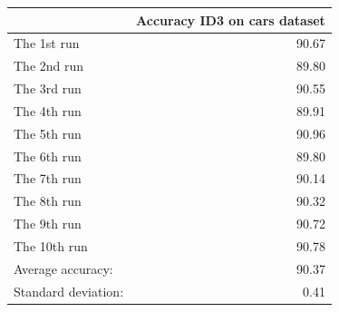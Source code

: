 \begin{tabular}{lr}
\toprule
{} &  Accuracy ID3 on cars dataset \\
\midrule
The 1st run         &                         90.67 \\
The 2nd run         &                         89.80 \\
The 3rd run         &                         90.55 \\
The 4th run         &                         89.91 \\
The 5th run         &                         90.96 \\
The 6th run         &                         89.80 \\
The 7th run         &                         90.14 \\
The 8th run         &                         90.32 \\
The 9th run         &                         90.72 \\
The 10th run        &                         90.78 \\
Average accuracy:   &                         90.37 \\
Standard deviation: &                          0.41 \\
\bottomrule
\end{tabular}
